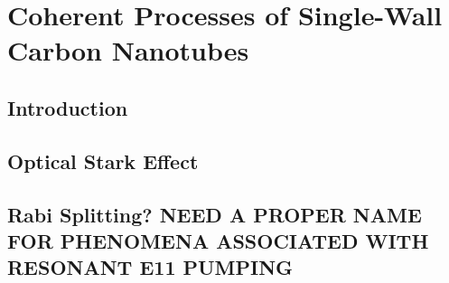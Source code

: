 \chapter{Coherent Processes of Single-Wall Carbon Nanotubes}

\section{Introduction}

\section{Optical Stark Effect}

\section{\color{red} Rabi Splitting? NEED A PROPER NAME FOR PHENOMENA ASSOCIATED WITH RESONANT E11 PUMPING}